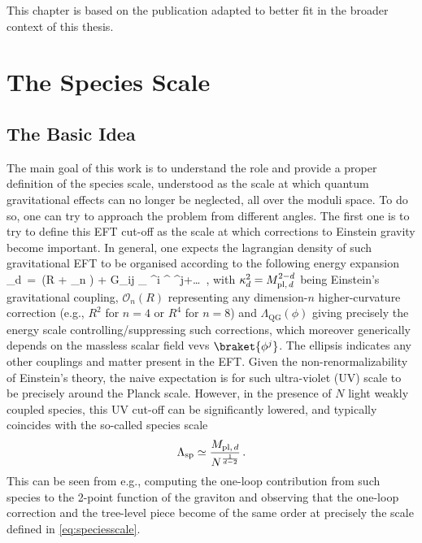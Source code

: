 
This chapter is based on the publication \cite{Castellano:2023aum} adapted to better fit in the broader context of this thesis. %

\section{The Species Scale}
\label{s:speciesscale}

\subsection{The Basic Idea}
\label{ss:basics}
The main goal of this work is to understand the role and provide a proper definition of the species scale, understood as the scale at which quantum gravitational effects can no longer be neglected, all over the moduli space. To do so, one can try to approach the problem from different angles. The first one is to try to define this EFT cut-off as the scale at which corrections to Einstein gravity become important. In general, one expects the lagrangian density of such gravitational EFT to be organised according to the following energy expansion
%
\beq
{}_{d}\, =\, \left(R + \sum_n \right) +  G_{ij} \partial_{\mu} \phi^i \partial^{\mu} \phi^j+\ldots \, ,
\label{eq:gravEFTexpansion}
\eeq
%
with $\kappa_d^{2}=M_{\text{pl,\,}d}^{2-d}$ being Einstein's gravitational coupling, $\mathcal{O}_n (R)$ representing any dimension-$n$ higher-curvature correction (e.g., $R^2$ for $n=4$ or $R^4$ for $n=8$) and $\Lambda_{\text{QG}}(\phi)$ giving precisely the energy scale controlling/suppressing such corrections, which moreover generically depends on the massless scalar field vevs $\braket{\phi^j}$. The ellipsis indicates any other couplings and matter present in the EFT. Given the non-renormalizability of Einstein's theory, the naive expectation is for such ultra-violet (UV) scale to be precisely around the Planck scale. However, in the presence of $N$ light weakly coupled species, this UV cut-off can be significantly lowered, and typically coincides with the so-called species scale \cite{Dvali:2007hz,Dvali:2007wp}
%
\begin{equation}
\label{eq:speciesscale}
    \Lambda_{\text{sp}}\simeq \dfrac{M_{\text{pl,\,}d}}{N^{\frac{1}{d-2}}}\, .
\end{equation}
%
This can be seen from e.g., computing the one-loop contribution from such species to the 2-point function of the graviton and observing that the one-loop correction and the tree-level piece become of the same order at precisely the scale defined in \eqref{eq:speciesscale}.

